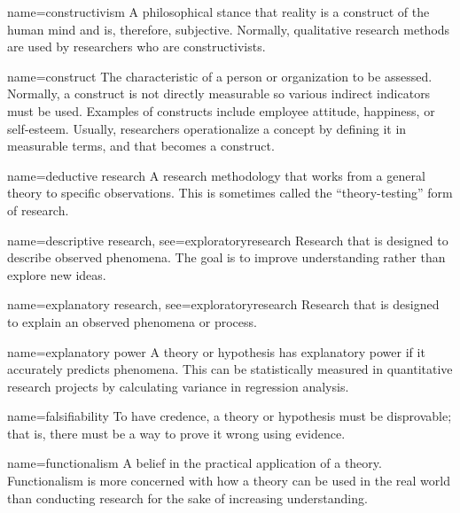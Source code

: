{name={constructivism}}
{%
	A philosophical stance that reality is a construct of the human mind and is, therefore, subjective. Normally, qualitative research methods are used by researchers who are constructivists.
}

{name={construct}}
{%
	The characteristic of a person or organization to be assessed. Normally, a construct is not directly measurable so various indirect indicators must be used. Examples of constructs include employee attitude, happiness, or self-esteem. Usually, researchers operationalize a concept by defining it in measurable terms, and that becomes a construct.
}

{name={deductive research}}
{%
	A research methodology that works from a general theory to specific observations. This is sometimes called the ``theory-testing'' form of research.
}

{name={descriptive research},
 see={exploratoryresearch}}
{%
	Research that is designed to describe observed phenomena. The goal is to improve 	understanding rather than explore new ideas.
}


{name={explanatory research},
	see={exploratoryresearch}}
{%
	Research that is designed to explain an observed phenomena or process. 
}

{name={explanatory power}}
{%
	A theory or hypothesis has explanatory power if it accurately predicts phenomena. This can be statistically measured in quantitative research projects by calculating variance in regression analysis.
}


{name={falsifiability}}
{%
	To have credence, a theory or hypothesis must be disprovable; that is, there must be a way to prove it wrong using evidence.
}

{name={functionalism}}
{%
	A belief in the practical application of a theory. Functionalism is more concerned with how a theory can be used in the real world than conducting	research for the sake of increasing understanding. 
}

